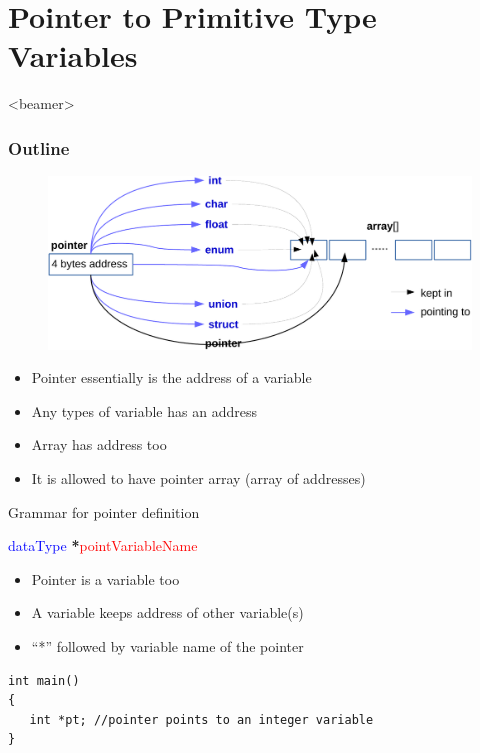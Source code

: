 \section{Pointer to Primitive Type Variables}
\label{sec:structs}
\begin{frame}<beamer>
    \frametitle{Outline}
    \tableofcontents[currentsection]
\end{frame}

\begin{frame}
	\begin{figure}
		\includegraphics[width=0.92\linewidth]{figs/pt_type_demo.pdf}
	\end{figure}
	\begin{itemize}
		\item {Pointer essentially is the address of a variable}
		\item {Any types of variable has an address}
		\item {Array has address too}
		\item {It is allowed to have pointer array (array of addresses)}
	\end{itemize}
\end{frame}

\begin{frame}[fragile]{Grammar for pointer definition}
\begin{center}
	\Large{
	  \textcolor{blue}{dataType} \textbf{*}\textcolor{red}{pointVariableName}
	}
\end{center}
\begin{itemize}
	\item {Pointer is a variable too}
	\item {A variable keeps address of other variable(s)}
	\item {``*'' followed by variable name of the pointer}
\end{itemize}
\begin{lstlisting}[xleftmargin=0.08\linewidth, linewidth=0.9\linewidth]
int main()
{
   int *pt; //pointer points to an integer variable
}
\end{lstlisting}
\end{frame}

